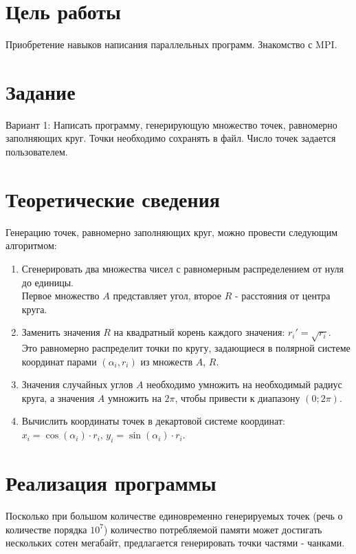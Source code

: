 \documentclass[12pt,a4paper]{article}
\begin{document}
\makeqtitle
\setcounter{page}{2}

\section{Цель работы}

Приобретение навыков написания параллельных программ. Знакомство с MPI.

\section{Задание}

Вариант 1: Написать программу, генерирующую множество точек, равномерно
заполняющих круг. Точки необходимо сохранять в файл. Число точек задается
пользователем.

\section{Теоретические сведения}

Генерацию точек, равномерно заполняющих круг, можно провести следующим алгоритмом:

\begin{enumerate}
    \item Сгенерировать два множества чисел с равномерным распределением от нуля до единицы. \\
          Первое множество $A$ представляет угол, второе $R$ - расстояния от центра круга.
    \item Заменить значения $R$ на квадратный корень каждого значения: $r_i' = \sqrt{r_i}$. \\
          Это равномерно распределит точки по кругу, задающиеся в полярной системе координат
          парами $(\alpha_i, r_i)$ из множеств $A$, $R$.
    \item Значения случайных углов $A$ необходимо умножить на необходимый радиус круга,
          а значения $A$ умножить на $2\pi$, чтобы привести к диапазону $(0; 2\pi)$.
    \item Вычислить координаты точек в декартовой системе координат: $x_i = \cos(\alpha_i) \cdot r_i,\, y_i = \sin(\alpha_i) \cdot r_i$.
\end{enumerate}


\section{Реализация программы}

Посколько при большом количестве единовременно генерируемых точек (речь о количестве порядка $10^7$)
количество потребляемой памяти может достигать нескольких сотен мегабайт, предлагается
генерировать точки частями - чанками.
\end{document}

